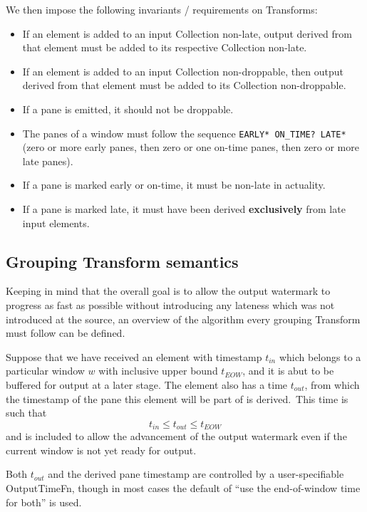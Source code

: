 We then impose the following invariants / requirements on Transforms:
\begin{itemize}
	\item If an element is added to an input Collection non-late, output derived from that element must be added to its respective Collection non-late.
	\item If an element is added to an input Collection non-droppable, then output derived from that element must be added to its Collection non-droppable.
	\item If a pane is emitted, it should not be droppable.
	\item The panes of a window must follow the sequence \verb|EARLY* ON_TIME? LATE*| (zero or more early panes, then zero or one on-time panes, then zero or more late panes).
	\item If a pane is marked early or on-time, it must be non-late in actuality.
	\item If a pane is marked late, it must have been derived \textbf{exclusively} from late input elements.
\end{itemize}

\subsection{Grouping Transform semantics}


Keeping in mind that the overall goal is to allow the output watermark to progress as fast as possible without introducing any lateness which was not introduced at the source, an overview of the algorithm every grouping Transform must follow can be defined.

Suppose that we have received an element with timestamp $t_{\mathit{in}}$ which belongs to a particular window $w$ with inclusive upper bound $t_{\mathit{EOW}}$, and it is abut to be buffered for output at a later stage.
The element also has a time $t_{\mathit{out}}$, from which the timestamp of the pane this element will be part of is derived.\footnotemark\ 
This time is such that \[t_{\mathit{in}} \leq t_{\mathit{out}} \leq t_{\mathit{EOW}}\] and is included to allow the advancement of the output watermark even if the current window is not yet ready for output.

\footnotetext
{
Both $t_{\mathit{out}}$ and the derived pane timestamp are controlled by a user-specifiable OutputTimeFn, though in most cases the default of ``use the end-of-window time for both'' is used.
}

